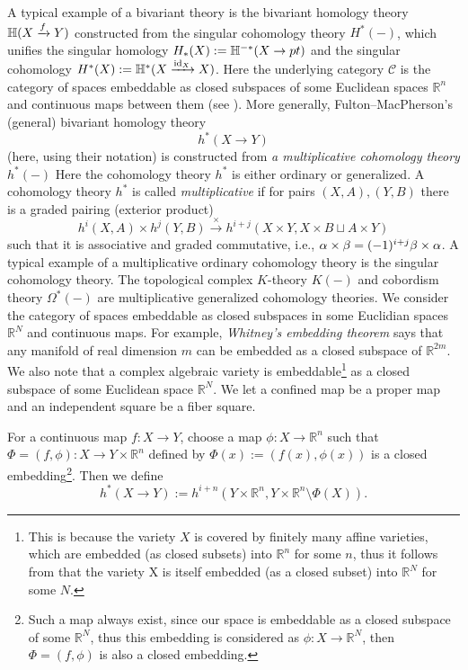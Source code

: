 \documentclass[a4paper]{amsart}
\begin{document}
A typical example of a bivariant theory is the bivariant homology theory $\mathbb H(X \xrightarrow f Y)$ 
constructed from the singular cohomology theory $H^*(-)$, which unifies the singular homology $H_*(X):=\mathbb H^{-*}(X \to pt)$ and the singular cohomology $H^*(X):=\mathbb H^*(X \xrightarrow {\operatorname{id}_X} X)$. Here the underlying category $\mathscr C$ is the category of spaces embeddable as closed subspaces of some Euclidean spaces $\mathbb R^n$ and continuous maps between them (see \cite[\S 3 Topological Theories]{FM}).
More generally, Fulton--MacPherson's (general) bivariant homology theory 
$$h^*(X \to Y)$$
(here, using their notation) 
is constructed from \emph{a multiplicative cohomology theory $h^*(-)$} \cite[\S 3.1]{FM} %
Here the cohomology theory $h^*$ is either ordinary or generalized. %
A cohomology theory $h^*$ is called \emph{multiplicative} if for pairs $(X,A), (Y,B)$ there is a graded pairing (exterior product)%
$$h^i(X,A) \times h^j(Y,B) \xrightarrow {\times} h^{i+j}(X \times Y, X \times B \sqcup A \times Y)$$
such that it is associative and graded commutative, i.e., $\alpha \times \beta = (-1)^{i+j} \beta \times \alpha$.
A typical example of a multiplicative ordinary cohomology theory is the singular cohomology theory. The topological complex $K$-theory $K(-)$ and cobordism theory $\Omega^*(-)$ are  multiplicative generalized  cohomology theories. We consider the category of spaces embeddable as closed subspaces in some Euclidian spaces $\mathbb R^N$ and continuous maps. For example, \emph{Whitney's embedding theorem} says that any manifold of real dimension $m$ can be embedded as a closed subspace of $\mathbb R^{2m}$. We also note that a complex algebraic variety is embeddable\footnote{This is because the variety $X$ is covered by finitely many affine varieties, which are embedded (as closed subsets) into $\mathbb R^n$ for some $n$, thus it follows from \cite[\S 8.8 Proposition]{Dold} that the variety X is itself embedded (as a closed subset) into $\mathbb R^N$ for some $N$. }  as a closed subspace of some Euclidean space $\mathbb R^N$. We let a confined map be a proper map and an independent square be a fiber square.
\begin{def}\label{biv-hom}
For a continuous map $f:X \to Y$, choose a map $\phi: X \to \mathbb R^n$ such that $\Phi=(f, \phi): X \to Y \times \mathbb R^n$ defined by $\Phi(x):=(f(x), \phi(x))$ is  a closed embedding\footnote{ Such a map always exist, since our space is embeddable as a closed subspace of some $\mathbb R^N$, thus this embedding is considered as $\phi:X \to \mathbb R^N$, then $\Phi=(f, \phi)$ is also a closed embedding.}. Then we define
\begin{equation}\label{embed}
h^*(X \to Y):= h^{i+n}(Y \times \mathbb R^n, Y \times \mathbb R^n \setminus \Phi(X)).
\end{equation}
\end{def}
\end{document}

